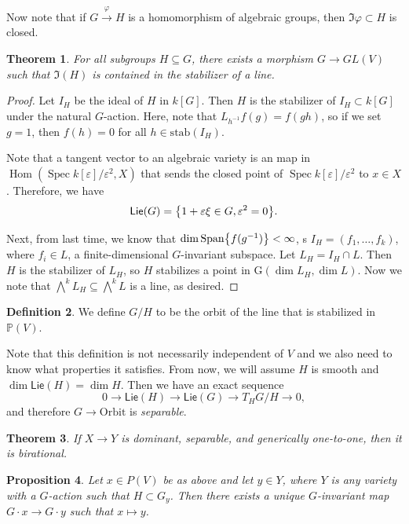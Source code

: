 \documentclass[leqno, openany]{memoir}
\newtheorem{thm}{Theorem}[section]
\newtheorem{prop}[thm]{Proposition}
\theoremstyle{definition}
\newtheorem{defn}[thm]{Definition}
\theoremstyle{remark}
\theoremstyle{plain}
\theoremstyle{definition}
\theoremstyle{remark}
\renewcommand{\P}{\mathbb{P}}
\newcommand{\ep}{\varepsilon}
\newcommand{\mr}[1]{\mathrm{#1}}
\newcommand{\ms}[1]{\mathsf{#1}}
\DeclareMathOperator{\Hom}{Hom}
\DeclareMathOperator{\Spec}{Spec}
\begin{document}
Now note that if $G \xrightarrow{\varphi} H$ is a homomorphism of algebraic
groups, then $\Im \varphi \subset H$ is closed.

\begin{thm} For all subgroups $H \subseteq G$, there exists a morphism $G \to
GL(V)$ such that $\Im(H)$ is contained in the stabilizer of a line.  \end{thm}

\begin{proof} Let $I_H$ be the ideal of $H$ in $k[G]$. Then $H$ is the
    stabilizer of $I_H \subset k[G]$ under the natural $G$-action. Here, note
    that $L_{h^{-1}} f(g) = f(gh)$, so if we set $g = 1$, then $f(h) = 0$ for
    all $h \in \mr{stab}(I_H)$.

Note that a tangent vector to an algebraic variety is an map in $\Hom(\Spec
k[\ep]/\ep^2, X)$ that sends the closed point of $\Spec k[\ep]/\ep^2$ to $x \in
X$. Therefore, we have \[ \ms{Lie}(G) = \qty{1 + \ep \xi \in G, \ep^2 = 0}. \]

Next, from last time, we know that $\dim \mr{Span} \qty{f(g^{-1})} < \infty$, s
$I_H = (f_1, \ldots, f_k)$, where $f_i \in L$, a finite-dimensional
$G$-invariant subspace. Let $L_H = I_H \cap L$. Then $H$ is the stabilizer of
$L_H$, so $H$ stabilizes a point in $\mr{G}(\dim L_H, \dim L)$. Now we note
that $\bigwedge^k L_H \subseteq \bigwedge^k L$ is a line, as desired.
\end{proof}

\begin{defn} We define $G/H$ to be the orbit of the line that is stabilized in
$\P(V)$.  \end{defn}

Note that this definition is not necessarily independent of $V$ and we also
need to know what properties it satisfies. From now, we will assume $H$ is
smooth and $\dim \ms{Lie}(H) = \dim H$. Then we have an exact sequence \[ 0 \to
\ms{Lie}(H) \to \ms{Lie}(G) \to T_H G/H \to 0, \] and therefore $G \to
\mr{Orbit}$ is \textit{separable}. 

\begin{thm} If $X \to Y$ is dominant, separable, and generically one-to-one,
then it is birational.  \end{thm}

\begin{prop} Let $x \in P(V)$ be as above and let $y \in Y$, where $Y$ is any
variety with a $G$-action such that $H \subset G_y$. Then there exists a unique
$G$-invariant map $G \cdot x \to G \cdot y$ such that $x \mapsto y$.
\end{prop}
\end{document}
